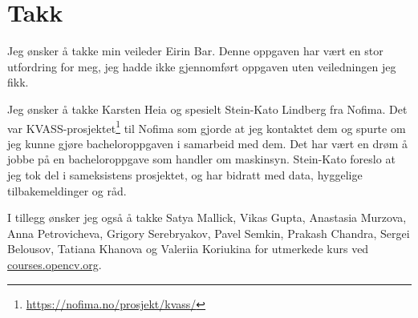 \section*{Takk}

Jeg ønsker å takke min veileder Eirin Bar. Denne oppgaven har vært en stor utfordring for meg, jeg hadde ikke gjennomført oppgaven uten veiledningen jeg fikk. 

Jeg ønsker å takke Karsten Heia og spesielt Stein-Kato Lindberg fra Nofima. Det var KVASS-prosjektet\footnote{\url{https://nofima.no/prosjekt/kvass/}} til Nofima som gjorde at jeg kontaktet dem og spurte om jeg kunne gjøre bacheloroppgaven i samarbeid med dem. Det har vært en drøm å jobbe på en bacheloroppgave som handler om maskinsyn. Stein-Kato foreslo at jeg tok del i sameksistens prosjektet, og har bidratt med data, hyggelige tilbakemeldinger og råd.

I tillegg ønsker jeg også å takke Satya Mallick, Vikas Gupta, Anastasia Murzova, Anna Petrovicheva, Grigory Serebryakov, Pavel Semkin, Prakash Chandra, Sergei Belousov, Tatiana Khanova og Valeriia Koriukina for utmerkede kurs ved \url{courses.opencv.org}.


